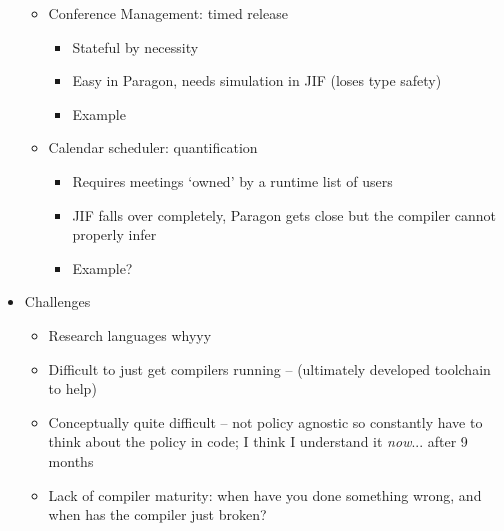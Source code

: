 \begin{itemize}
\begin{itemize}
\begin{itemize}
		\end{itemize}
	
		\item Conference Management: timed release
		
		\begin{itemize}
			
			\item Stateful by necessity
			
			\item Easy in Paragon, needs simulation in JIF (loses type safety)
			
			\item Example
			
		\end{itemize}
	
		\item Calendar scheduler: quantification
		
		\begin{itemize}
			
			\item Requires meetings `owned' by a runtime list of users
			
			\item JIF falls over completely, Paragon gets close but the compiler cannot properly infer
			
			\item Example?
			
		\end{itemize}
		
	\end{itemize}
	
	\item Challenges
	
	\begin{itemize}
		
		\item Research languages whyyy
		
		\item Difficult to just get compilers running -- (ultimately developed toolchain to help)
		
		\item Conceptually quite difficult -- not policy agnostic so constantly have to think about the policy in code; I think I understand it \textit{now}... after 9 months
		
		\item Lack of compiler maturity: when have you done something wrong, and when has the compiler just broken?
		
	\end{itemize}


\end{itemize}
